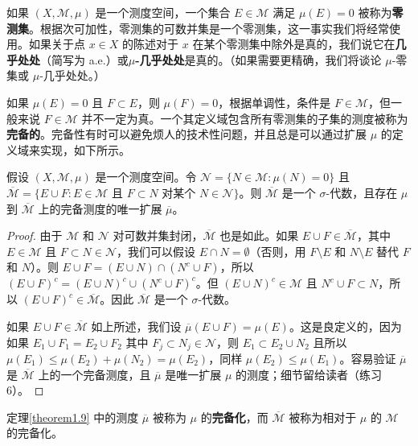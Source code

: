 \documentclass[lang=cn,10pt,thmcnt=section]{elegantbook}
\begin{document}
如果 $(X, \mathcal{M}, \mu)$ 是一个测度空间，一个集合 $E \in \mathcal{M}$ 满足 $\mu(E) = 0$ 被称为\textbf{零测集}。根据次可加性，零测集的可数并集是一个零测集，这一事实我们将经常使用。如果关于点 $x \in X$ 的陈述对于 $x$ 在某个零测集中除外是真的，我们说它在\textbf{几乎处处}（简写为 a.e.）或\textbf{$\mu$-几乎处处}是真的。（如果需要更精确，我们将谈论 $\mu$-零集或 $\mu$-几乎处处。）

如果 $\mu(E) = 0$ 且 $F \subset E$，则 $\mu(F) = 0$，根据单调性，条件是 $F \in \mathcal{M}$，但一般来说 $F \in \mathcal{M}$ 并不一定为真。一个其定义域包含所有零测集的子集的测度被称为\textbf{完备的}。完备性有时可以避免烦人的技术性问题，并且总是可以通过扩展 $\mu$ 的定义域来实现，如下所示。

\begin{theorem}\label{theorem1.9}
假设 $(X, \mathcal{M}, \mu)$ 是一个测度空间。令 $\mathcal{N} = \{N \in \mathcal{M} : \mu(N) = 0\}$ 且 $\overline{\mathcal{M}} = \{E \cup F : E \in \mathcal{M} \text{ 且 } F \subset N \text{ 对某个 } N \in \mathcal{N}\}$。则 $\overline{\mathcal{M}}$ 是一个 $\sigma$-代数，且存在 $\mu$ 到 $\overline{\mathcal{M}}$ 上的完备测度的唯一扩展 $\overline{\mu}$。
\end{theorem}

\begin{proof}
由于 $\mathcal{M}$ 和 $\mathcal{N}$ 对可数并集封闭，$\overline{\mathcal{M}}$ 也是如此。如果 $E \cup F \in \overline{\mathcal{M}}$，其中 $E \in \mathcal{M}$ 且 $F \subset N \in \mathcal{N}$，我们可以假设 $E \cap N = \emptyset$（否则，用 $F \setminus E$ 和 $N \setminus E$ 替代 $F$ 和 $N$）。则 $E \cup F = (E \cup N) \cap (N^c \cup F)$，所以 $(E \cup F)^c = (E \cup N)^c \cup (N^c \cup F)^c$。但 $(E \cup N)^c \in \mathcal{M}$ 且 $N^c \cup F \subset N$，所以 $(E \cup F)^c \in \overline{\mathcal{M}}$。因此 $\overline{\mathcal{M}}$ 是一个 $\sigma$-代数。

如果 $E \cup F \in \overline{\mathcal{M}}$ 如上所述，我们设 $\overline{\mu}(E \cup F) = \mu(E)$。这是良定义的，因为如果 $E_1 \cup F_1 = E_2 \cup F_2$ 其中 $F_j \subset N_j \in \mathcal{N}$，则 $E_1 \subset E_2 \cup N_2$ 且所以 $\mu(E_1) \leq \mu(E_2) + \mu(N_2) = \mu(E_2)$，同样 $\mu(E_2) \leq \mu(E_1)$。容易验证 $\overline{\mu}$ 是 $\overline{\mathcal{M}}$ 上的一个完备测度，且 $\overline{\mu}$ 是唯一扩展 $\mu$ 的测度；细节留给读者（练习 6）。
\end{proof}

定理\ref{theorem1.9} 中的测度 $\overline{\mu}$ 被称为 $\mu$ 的\textbf{完备化}，而 $\overline{\mathcal{M}}$ 被称为相对于 $\mu$ 的 $\mathcal{M}$ 的完备化。
\end{document}
